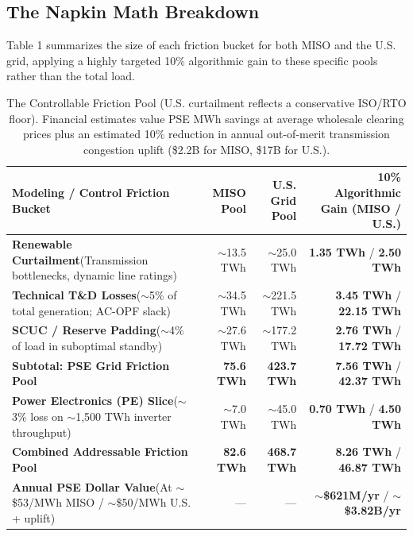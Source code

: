 \documentclass[11pt, a4paper]{article}
\begin{document}
\subsection{The Napkin Math Breakdown}

Table 1 summarizes the size of each friction bucket for both MISO and the U.S. grid, applying a highly targeted 10\% algorithmic gain to these specific pools rather than the total load.

\begin{table}[htbp]
\centering\small
\begin{tabularx}{\linewidth}{@{}X r r r@{}}
\toprule
\textbf{Modeling / Control Friction Bucket} & \textbf{MISO Pool} & \textbf{U.S. Grid Pool} & \textbf{10\% Algorithmic Gain (MISO / U.S.)} \\ \midrule
\textbf{Renewable Curtailment}\newline (Transmission bottlenecks, dynamic line ratings) & $\sim$13.5 TWh & $\sim$25.0 TWh & \textbf{1.35 TWh} / \textbf{2.50 TWh} \\ \addlinespace
\textbf{Technical T\&D Losses}\newline ($\sim$5\% of total generation; AC-OPF slack) & $\sim$34.5 TWh & $\sim$221.5 TWh & \textbf{3.45 TWh} / \textbf{22.15 TWh} \\ \addlinespace
\textbf{SCUC / Reserve Padding}\newline ($\sim$4\% of load in suboptimal standby) & $\sim$27.6 TWh & $\sim$177.2 TWh & \textbf{2.76 TWh} / \textbf{17.72 TWh} \\ \addlinespace
\textbf{Subtotal: PSE Grid Friction Pool} & \textbf{75.6 TWh} & \textbf{423.7 TWh} & \textbf{7.56 TWh} / \textbf{42.37 TWh} \\ \midrule
\textbf{Power Electronics (PE) Slice}\newline ($\sim$3\% loss on $\sim$1,500 TWh inverter throughput) & $\sim$7.0 TWh & $\sim$45.0 TWh & \textbf{0.70 TWh} / \textbf{4.50 TWh} \\ \midrule
\textbf{Combined Addressable Friction Pool} & \textbf{82.6 TWh} & \textbf{468.7 TWh} & \textbf{8.26 TWh} / \textbf{46.87 TWh} \\ \addlinespace
\textbf{Annual PSE Dollar Value}\newline (At $\sim$\$53/MWh MISO / $\sim$\$50/MWh U.S. + uplift) & --- & --- & \textbf{$\sim$\$621M/yr} / \textbf{$\sim$\$3.82B/yr} \\
\bottomrule
\end{tabularx}
\caption{The Controllable Friction Pool (U.S. curtailment reflects a conservative ISO/RTO floor). Financial estimates value PSE MWh savings at average wholesale clearing prices plus an estimated 10\% reduction in annual out-of-merit transmission congestion uplift (\$2.2B for MISO, \$17B for U.S.).}
\end{table}
\end{document}

